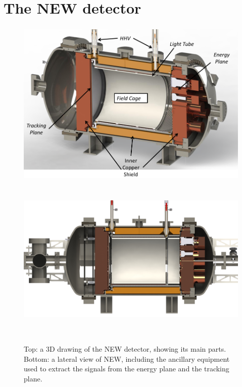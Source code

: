 \section{The NEW detector}
\label{sec.new}


\begin{figure}[hpt!]
\centering
\includegraphics[height=8cm]{img2/NEWMay20163D.png}
\includegraphics[height=8cm]{img2/NEWMay2016.png}
\caption{Top: a 3D drawing of the NEW detector, showing its main parts. Bottom: a lateral view of NEW, including the ancillary equipment used to extract the signals from the energy plane and the tracking plane.  } \label{fig:NewOverview}
\end{figure}

